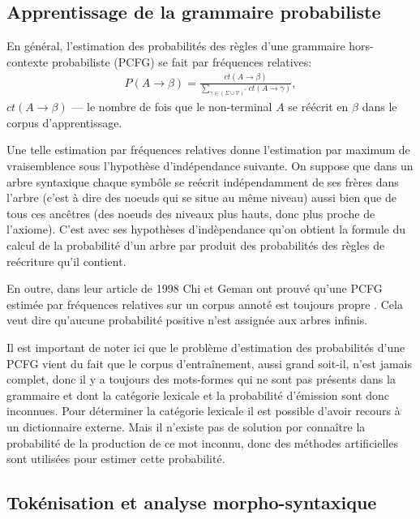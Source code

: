 \documentclass[12pt]{article}
\begin{document}
\subsection{Apprentissage de la grammaire probabiliste}

En g\'en\'eral, l'estimation des probabilit\'es des r\`egles d'une grammaire
hors-contexte probabiliste (PCFG) se fait par fr\'equences relatives:
\begin{eqnarray}
P(A \rightarrow \beta) = \frac{ct(A \rightarrow \beta)}{\sum\limits_{\gamma \in (\Sigma \cup \mathcal{V})^*}{ct(A \rightarrow \gamma)}},
\end{eqnarray}
$ct(A \rightarrow \beta)$ --- le nombre de fois que le non-terminal $A$ se
r\'e\'ecrit en $\beta$ dans le corpus d'apprentissage.

Une telle estimation par fr\'equences relatives donne l'estimation par maximum de vraisemblence
sous l'hypoth\`ese d'ind\'ependance suivante. On suppose que dans un arbre syntaxique chaque 
symb\^ole se re\'ecrit ind\'ependamment de ses fr\`eres dans l'arbre (c'est \`a dire des noeuds qui se situe
au m\^eme niveau) aussi bien que de tous ces anc\^etres (des noeuds des niveaux plus hauts, donc plus proche de l'axiome). C'est avec ses hypoth\`eses d'ind\`ependance qu'on obtient la formule du calcul de la probabilit\'e
d'un arbre par produit des probabilit\'es des r\`egles de re\'ecriture qu'il contient. 

En outre, dans leur article de 1998 Chi et Geman ont prouv\'e qu'une PCFG estim\'ee par
fr\'equences relatives sur un corpus annot\'e est toujours propre
\cite{proper_PCFG_estimation}. Cela veut dire qu'aucune probabilit\'e positive
n'est assign\'ee aux arbres infinis.

Il est important de noter ici que le probl\`eme d'estimation des probabilit\'es
d'une PCFG vient du fait que le corpus d'entra\^inement, aussi grand soit-il,
n'est jamais complet, donc il y a toujours des mots-formes qui ne sont pas
pr\'esents dans la grammaire et dont la cat\'egorie lexicale et la
probabilit\'e d'\'emission sont donc inconnues. Pour d\'eterminer la cat\'egorie
lexicale il est possible d'avoir recours \`a un dictionnaire externe. Mais il
n'existe pas de solution por conna\^itre la probabilit\'e de la production de ce
mot inconnu, donc des m\'ethodes artificielles sont utilis\'ees pour estimer
cette probabilit\'e.


\subsection{Tok\'enisation et analyse morpho-syntaxique}
\end{document}
